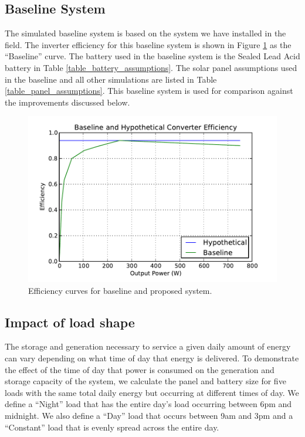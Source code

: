 \documentclass[conference]{IEEEtran}
\begin{document}
\subsection{Baseline System}
The simulated baseline system is based on the system we have
installed in the field.
The inverter efficiency for this baseline system is shown in Figure
\ref{inverter_curves} as the ``Baseline'' curve.
The battery used in the baseline system is the Sealed Lead Acid
battery in Table \ref{table_battery_assumptions}.
The solar panel assumptions used in the baseline and all other
simulations are listed in Table \ref{table_panel_assumptions}.
This baseline system is used for comparison against the
improvements discussed below.

\begin{figure}[]
\begin{center}
\includegraphics[width=\columnwidth]{figures/inverter_curves.pdf}
\end{center}
\caption{Efficiency curves for baseline and proposed system.}
\label{inverter_curves}
\end{figure}

\subsection{Impact of load shape}

The storage and generation necessary to service a given daily
amount of energy can vary depending on what time of day
that energy is delivered.
To demonstrate the effect of the time of day that power
is consumed on the generation and storage capacity of the system,
we calculate the panel and battery size for five loads with
the same total daily energy but occurring at different times of day.
We define a ``Night'' load that has the entire day's load
occurring between 6pm and midnight.
We also define a ``Day'' load that occurs between 9am and 3pm
and a ``Constant'' load that is evenly spread across the entire day.
\end{document}

